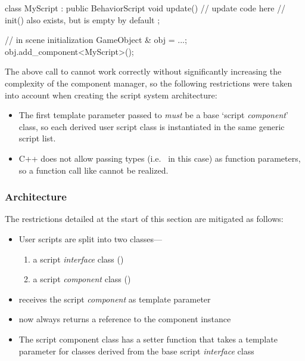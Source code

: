 \documentclass{projdoc}
\begin{document}
\begin{blockcode}
class MyScript : public BehaviorScript {
	void update() {
		// update code here
	}
	// init() also exists, but is empty by default
};

{ // in scene initialization
	GameObject & obj = ...;
	obj.add_component<MyScript>();
}
\end{blockcode}

The above call to  cannot work correctly
without significantly increasing the complexity of the component manager, so the
following restrictions were taken into account when creating the script system
architecture:\noparbreak

\begin{itemize}
	\item The first template parameter passed to 
		\emph{must} be a base `script \emph{component}' class, so each derived user
		script class is instantiated in the same generic script list.
	\item C++ does not allow passing types (i.e.~ in this case) as
		function parameters, so a function call like
		 cannot be realized.
\end{itemize}

\subsubsection{Architecture}
\label{sec:scripts:architecture}

The restrictions detailed at the start of this section are mitigated as
follows:\noparbreak

\begin{itemize}
	\item User scripts are split into two classes---
		\begin{enumerate}
			\item a script \emph{interface} class ()
			\item a script \emph{component} class ()
		\end{enumerate}
	\item {} receives the script \emph{component}
		as template parameter
	\item {} now always returns a reference to the
		component instance
	\item The script component class has a setter function that takes a template
		parameter for classes derived from the base script \emph{interface} class
\end{itemize}
\end{document}
